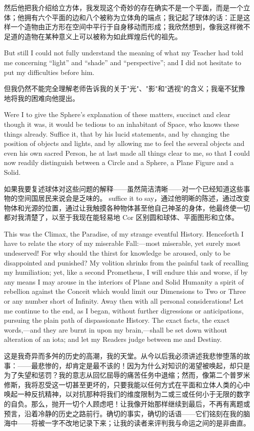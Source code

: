 \documentclass[12pt,UTF8]{ctexbook}
\begin{document}
然后他把我介绍给立方体，我发现这个奇妙的存在确实不是一个平面，而是一个立体；他拥有六个平面的边和八个被称为立体角的端点；我记起了球体的话：正是这样一个造物由正方形在空间中平行于自身移动而形成；我欣然想到，像我这样微不足道的造物在某种意义上可以被称为如此辉煌后代的祖先。

But still I could not fully understand the meaning of what my Teacher had told me concerning ``light'' and ``shade'' and ``perspective''; and I did not hesitate to put my difficulties before him.

但我仍然不能完全理解老师告诉我的关于"光"、"影"和"透视"的含义；我毫不犹豫地将我的困难向他提出。

Were I to give the Sphere's explanation of these matters, succinct and clear though it was, it would be tedious to an inhabitant of Space, who knows these things already. Suffice it, that by his lucid statements, and by changing the position of objects and lights, and by allowing me to feel the several objects and even his own sacred Person, he at last made all things clear to me, so that I could now readily distinguish between a Circle and a Sphere, a Plane Figure and a Solid.

如果我要复述球体对这些问题的解释——虽然简洁清晰——对一个已经知道这些事物的空间国居民来说会是乏味的。 suffice it to say，通过他明晰的陈述，通过改变物体和光源的位置，通过让我触摸各种物体甚至他自己神圣的身体，他最终使一切都对我清楚了，以至于我现在能轻易地 Cor 区别圆和球体、平面图形和立体。

This was the Climax, the Paradise, of my strange eventful History. Henceforth I have to relate the story of my miserable Fall:---most miserable, yet surely most undeserved! For why should the thirst for knowledge be aroused, only to be disappointed and punished? My volition shrinks from the painful task of recalling my humiliation; yet, like a second Prometheus, I will endure this and worse, if by any means I may arouse in the interiors of Plane and Solid Humanity a spirit of rebellion against the Conceit which would limit our Dimensions to Two or Three or any number short of Infinity. Away then with all personal considerations! Let me continue to the end, as I began, without further digressions or anticipations, pursuing the plain path of dispassionate History. The exact facts, the exact words,---and they are burnt in upon my brain,---shall be set down without alteration of an iota; and let my Readers judge between me and Destiny.

这是我奇异而多舛的历史的高潮，我的天堂。从今以后我必须讲述我悲惨堕落的故事：——最悲惨的，却肯定是最不该的！因为为什么对知识的渴望被唤起，却只是为了失望和惩罚？我的意志从回忆屈辱的痛苦任务中退缩；然而，像第二个普罗米修斯，我将忍受这一切甚至更坏的，只要我能以任何方式在平面和立体人类的心中唤起一种反抗精神，以对抗那种将我们的维度限制为二或三或任何小于无限的数字的自负。那么，抛开一切个人顾虑吧！让我像开始那样继续到最后，不再有离题或预言，沿着冷静的历史之路前行。确切的事实，确切的话语——它们铭刻在我的脑海中——将被一字不改地记录下来；让我的读者来评判我与命运之间的是非曲直。
\end{document}
